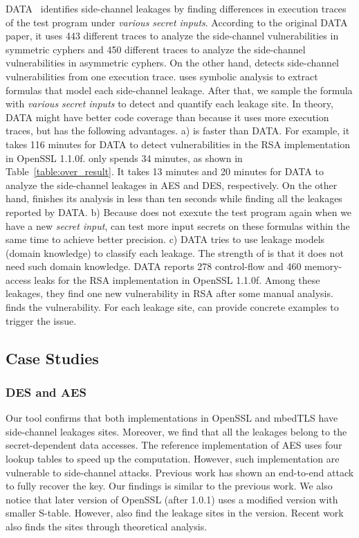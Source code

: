 DATA~\cite{217537} identifies
side-channel leakages by finding differences in execution traces of
the test program under \emph{various secret inputs}. According to
the original DATA paper, it uses 443 different traces to analyze the
side-channel vulnerabilities in symmetric cyphers and 450 different
traces to analyze the side-channel vulnerabilities in asymmetric
cyphers. On the other hand, \detect{} detects side-channel
vulnerabilities from one execution trace. \detect{} uses symbolic
analysis to extract formulas that model each side-channel
leakage. After that, we sample the formula with \emph{various
  secret inputs} to detect and quantify each leakage site. In
theory, DATA might have better code coverage than \detect{} because it
uses more execution traces,  but \detect{} has the following
advantages. a) \detect{} is faster than DATA. For example, it takes
116 minutes for DATA to detect vulnerabilities in the RSA implementation in OpenSSL 1.1.0f\@. \detect{} only spends 34 minutes, as shown in Table~\ref{table:over_result}. It takes 13 minutes and 20 minutes
for DATA to analyze the side-channel leakages in AES and DES,
respectively. On the other hand, \detect{} finishes its analysis in
less than ten seconds while finding all the leakages reported by
DATA. b) Because \detect{} does not exexute the test program again when we
have a new \emph{secret input}, \detect{} can test more input secrets
on these formulas within the same time to achieve better precision.
c) DATA tries to use leakage models (domain knowledge) to classify each leakage.
The strength of \ctool{} is that it does not need such domain knowledge.
DATA reports 278 control-flow and 460 memory-access leaks for the RSA implementation in OpenSSL 1.1.0f. Among these leakages, they find one new vulnerability in RSA after some manual analysis.
\detect{} finds the vulnerability.  For each leakage site, \detect{} can provide
concrete examples to trigger the issue.
\subsection{Case Studies}
\subsubsection*{DES and AES}
Our tool confirms that both implementations in OpenSSL and mbedTLS have side-channel leakages
sites. Moreover, we find that all the leakages belong to the secret-dependent data accesses. The reference implementation of AES uses four lookup tables to speed up the computation. However, such implementation are vulnerable to side-channel attacks. Previous work has shown an end-to-end attack to fully recover the key. Our findings is similar to the previous work. We also notice that later version of OpenSSL (after 1.0.1) uses a modified version with smaller S-table. However, \detect{} also find the leakage sites in the version. Recent work also finds the sites through theoretical analysis.

